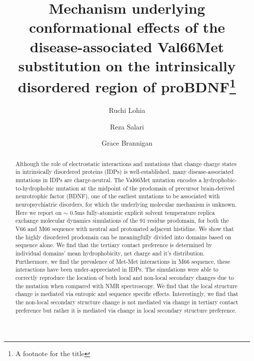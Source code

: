 \documentclass[journal=jacsat,manuscript=article]{achemso}
\author{Ruchi Lohia}
\author{Reza Salari}
\author{Grace Brannigan}
\affiliation[Rutgers University]
{Center for Computational and Integrative Biology, Rutgers University, Camden, NJ, USA}
\title[An \textsf{achemso} demo]
  {Mechanism underlying conformational effects of the disease-associated Val66Met substitution on the intrinsically disordered region of proBDNF\footnote{A footnote for the title}}
\begin{document}
\begin{abstract}
Although the role of electrostatic interactions and mutations that change charge states in intrinsically disordered proteins (IDPs) is well-established, many disease-associated mutations in IDPs are charge-neutral. The Val66Met mutation encodes a hydrophobic-to-hydrophobic mutation at the midpoint of the prodomain of precursor brain-derived neurotrophic factor (BDNF), one of the earliest mutations to be associated with neuropsychiatric disorders, for which the underlying molecular mechanism is unknown. Here we report on $\sim$ 0.5ms fully-atomistic explicit solvent temperature replica exchange molecular dynamics simulations of the 91 residue prodomain, for both the V66 and M66 sequence with neutral and protonated adjacent histidine.
We show that the highly disordered prodomain can be meaningfully divided into domains based on sequence alone. We find that the tertiary contact preference is determined by individual domains' mean hydrophobicity, net charge and it's distribution. Furthermore, we find the prevalence of Met-Met interactions in M66 sequence, these interactions have been under-appreciated in IDPs. 
The simulations were able to correctly reproduce the location of both local and non-local secondary changes due to the mutation when compared with NMR spectroscopy\cite{Anastasia2013}. We find that the local structure change is mediated via entropic and sequence specific effects. Interestingly, we find that the non-local secondary structure change is not mediated via change in tertiary contact preference but rather it is mediated via change in local secondary structure preference. 
\end{abstract}
\end{document}
